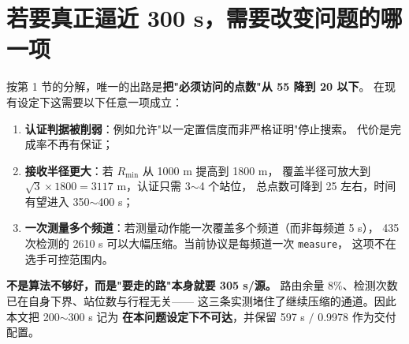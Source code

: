 \section{若要真正逼近 300 s，需要改变问题的哪一项}

按第 1 节的分解，唯一的出路是\textbf{把"必须访问的点数"从 55 降到 20 以下}。
在现有设定下这需要以下任意一项成立：

\begin{enumerate}[leftmargin=1.8em]
  \item \textbf{认证判据被削弱}：例如允许"以一定置信度而非严格证明"停止搜索。
        代价是完成率不再有保证；
  \item \textbf{接收半径更大}：若 $R_{\min}$ 从 1000 m 提高到 1800 m，
        覆盖半径可放大到 $\sqrt3\times1800=3117$ m，认证只需 3$\sim$4 个站位，
        总点数可降到 25 左右，时间有望进入 350$\sim$400 s；
  \item \textbf{一次测量多个频道}：若测量动作能一次覆盖多个频道（而非每频道 5 s），
        435 次检测的 2610 s 可以大幅压缩。当前协议是每频道一次 \texttt{measure}，
        这项不在选手可控范围内。
\end{enumerate}

\begin{keybox}[title=一句话总结]
\textbf{不是算法不够好，而是"要走的路"本身就要 305 s/源。}
路由余量 8\%、检测次数已在自身下界、站位数与行程无关——
这三条实测堵住了继续压缩的通道。因此本文把 200$\sim$300 s 记为
\textbf{在本问题设定下不可达}，并保留 597 s $/$ 0.9978 作为交付配置。
\end{keybox}


